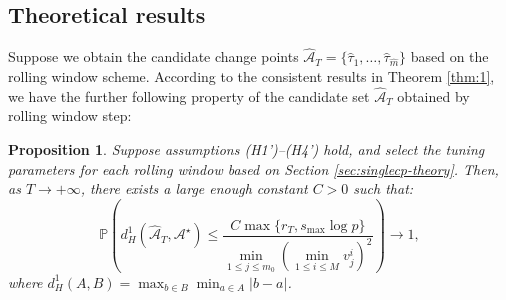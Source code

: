 \documentclass[11pt]{article}
\newtheorem{proposition}{Proposition}
\begin{document}
\subsection{Theoretical results}
\label{sec:multicp-theory}
Suppose we obtain the candidate change points $\widehat{\mathcal{A}}_T = \{\widehat{\tau}_1, \dots, \widehat{\tau}_{\widehat{m}}\}$ based on the rolling window scheme. According to the consistent results in Theorem \ref{thm:1}, we have the further following property of the candidate set $\widehat{\mathcal{A}}_T$ obtained by rolling window step:
\begin{proposition}
\label{prop:1}
Suppose assumptions (H1')--(H4') hold, and select the tuning parameters for each rolling window based on Section \ref{sec:singlecp-theory}. Then, as $T \to +\infty$, there exists a large enough constant $C>0$ such that:
\begin{equation*}
    \mathbb{P}\left( d_H^1(\widehat{\mathcal{A}}_T, \mathcal{A}^\star) \leq \frac{C\max\{r_T, s_{\max}\log p\}}{\min_{1\leq j \leq m_0}(\min_{1\leq i\leq M}v_j^i)^2} \right) \to 1,
\end{equation*}
where $d_H^1(A, B) = \max_{b\in B}\min_{a\in A}|b-a|$.
\end{proposition}
\end{document}
